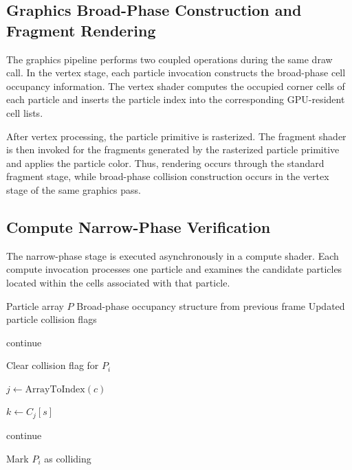 \documentclass{article}
\begin{document}
\subsection{Graphics Broad-Phase Construction and Fragment Rendering}

The graphics pipeline performs two coupled operations during the same draw call. In the vertex stage, each particle invocation constructs the broad-phase cell occupancy information. The vertex shader computes the occupied corner cells of each particle and inserts the particle index into the corresponding GPU-resident cell lists.

After vertex processing, the particle primitive is rasterized. The fragment shader is then invoked for the fragments generated by the rasterized particle primitive and applies the particle color. Thus, rendering occurs through the standard fragment stage, while broad-phase collision construction occurs in the vertex stage of the same graphics pass.

\subsection{Compute Narrow-Phase Verification}

The narrow-phase stage is executed asynchronously in a compute shader. Each compute invocation processes one particle and examines the candidate particles located within the cells associated with that particle.

\begin{algorithm}
\caption{Compute Narrow-Phase Collision Verification}
\begin{algorithmic}[1]
\Require Particle array \(P\)
\Require Broad-phase occupancy structure from previous frame
\Ensure Updated particle collision flags

        \State continue
    \EndIf

    \State Clear collision flag for \(P_i\)

        \State \(j \gets \text{ArrayToIndex}(c)\)

            \State \(k \gets C_j[s]\)

                \State continue
            \EndIf

                \State Mark \(P_i\) as colliding
            \EndIf
        \EndFor
    \EndFor
\EndFor
\end{algorithmic}
\end{algorithm}
\end{document}

